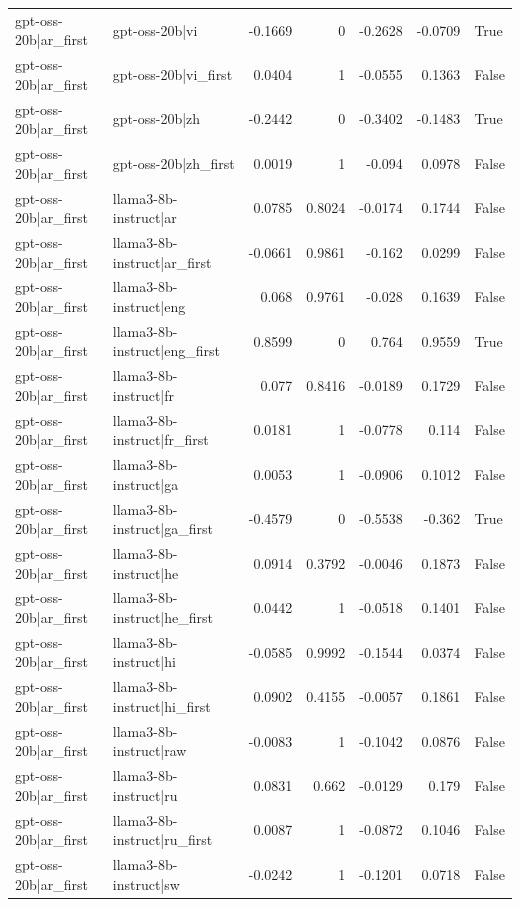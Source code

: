\begin{table}
\begin{tabular}{l l r r r r l}
gpt-oss-20b|ar_first & gpt-oss-20b|vi & -0.1669 & 0 & -0.2628 & -0.0709 & True \\
gpt-oss-20b|ar_first & gpt-oss-20b|vi_first & 0.0404 & 1 & -0.0555 & 0.1363 & False \\
gpt-oss-20b|ar_first & gpt-oss-20b|zh & -0.2442 & 0 & -0.3402 & -0.1483 & True \\
gpt-oss-20b|ar_first & gpt-oss-20b|zh_first & 0.0019 & 1 & -0.094 & 0.0978 & False \\
gpt-oss-20b|ar_first & llama3-8b-instruct|ar & 0.0785 & 0.8024 & -0.0174 & 0.1744 & False \\
gpt-oss-20b|ar_first & llama3-8b-instruct|ar_first & -0.0661 & 0.9861 & -0.162 & 0.0299 & False \\
gpt-oss-20b|ar_first & llama3-8b-instruct|eng & 0.068 & 0.9761 & -0.028 & 0.1639 & False \\
gpt-oss-20b|ar_first & llama3-8b-instruct|eng_first & 0.8599 & 0 & 0.764 & 0.9559 & True \\
gpt-oss-20b|ar_first & llama3-8b-instruct|fr & 0.077 & 0.8416 & -0.0189 & 0.1729 & False \\
gpt-oss-20b|ar_first & llama3-8b-instruct|fr_first & 0.0181 & 1 & -0.0778 & 0.114 & False \\
gpt-oss-20b|ar_first & llama3-8b-instruct|ga & 0.0053 & 1 & -0.0906 & 0.1012 & False \\
gpt-oss-20b|ar_first & llama3-8b-instruct|ga_first & -0.4579 & 0 & -0.5538 & -0.362 & True \\
gpt-oss-20b|ar_first & llama3-8b-instruct|he & 0.0914 & 0.3792 & -0.0046 & 0.1873 & False \\
gpt-oss-20b|ar_first & llama3-8b-instruct|he_first & 0.0442 & 1 & -0.0518 & 0.1401 & False \\
gpt-oss-20b|ar_first & llama3-8b-instruct|hi & -0.0585 & 0.9992 & -0.1544 & 0.0374 & False \\
gpt-oss-20b|ar_first & llama3-8b-instruct|hi_first & 0.0902 & 0.4155 & -0.0057 & 0.1861 & False \\
gpt-oss-20b|ar_first & llama3-8b-instruct|raw & -0.0083 & 1 & -0.1042 & 0.0876 & False \\
gpt-oss-20b|ar_first & llama3-8b-instruct|ru & 0.0831 & 0.662 & -0.0129 & 0.179 & False \\
gpt-oss-20b|ar_first & llama3-8b-instruct|ru_first & 0.0087 & 1 & -0.0872 & 0.1046 & False \\
gpt-oss-20b|ar_first & llama3-8b-instruct|sw & -0.0242 & 1 & -0.1201 & 0.0718 & False \\

\end{tabular}
\end{table}
